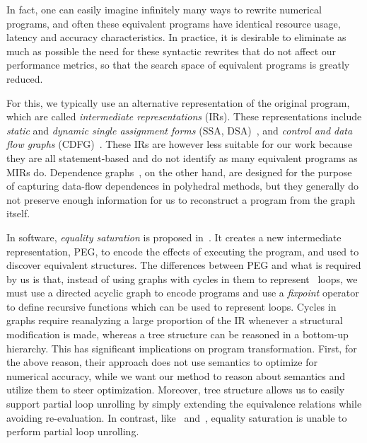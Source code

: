 In fact, one can easily imagine infinitely many ways to rewrite numerical
programs, and often these equivalent programs have identical resource usage,
latency and accuracy characteristics.  In practice, it is desirable to
eliminate as much as possible the need for these syntactic rewrites that do not
affect our performance metrics, so that the search space of equivalent programs
is greatly reduced.

For this, we typically use an alternative representation of the original
program, which are called \emph{intermediate representations} (IRs).  These
representations include \emph{static} and \emph{dynamic single assignment
forms} (SSA, DSA)~\cite{rau92, cytron91}, and \emph{control and data flow
graphs} (CDFG)~\cite{gajski94}.  These IRs are however less suitable for
our work because they are all statement-based and do not identify as many
equivalent programs as MIRs do.  Dependence graphs~\cite{rau94}, on the other
hand, are designed for the purpose of capturing data-flow dependences in
polyhedral methods, but they generally do not preserve enough information for
us to reconstruct a program from the graph itself.

In software, \emph{equality saturation} is proposed in~\cite{tate09}.  It
creates a new intermediate representation, PEG, to encode the effects of
executing the program, and used to discover equivalent structures.  The
differences between PEG and what is required by us is that, instead of using
graphs with cycles in them to represent \whilelit~loops, we must use a
directed acyclic graph to encode programs and use a \emph{fixpoint} operator
to define recursive functions which can be used to represent loops.  Cycles in
graphs require reanalyzing a large proportion of the IR whenever a structural
modification is made, whereas a tree structure can be reasoned in a bottom-up
hierarchy.  This has significant implications on program transformation.
First, for the above reason, their approach does not use semantics to optimize
for numerical accuracy, while we want our method to reason about semantics
and utilize them to steer optimization.  Moreover, tree structure allows us
to easily support partial loop unrolling by simply extending the equivalence
relations while avoiding re-evaluation.  In contrast, like~\cite{martel09}
and~\cite{damouche15}, equality saturation is unable to perform partial loop
unrolling.
